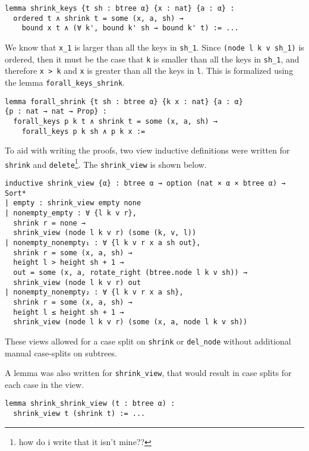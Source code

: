 \begin{lstlisting}
lemma shrink_keys {t sh : btree α} {x : nat} {a : α} :
  ordered t ∧ shrink t = some (x, a, sh) → 
    bound x t ∧ (∀ k', bound k' sh → bound k' t) := ...
\end{lstlisting}

We know that \lstinline{x_1} is larger than all the keys in \lstinline{sh_1}. Since \lstinline{(node l k v sh_1)} is ordered, then it must be the case that \lstinline{k} is smaller than all the keys in \lstinline{sh_1}, and therefore \lstinline{x > k} and \lstinline{x} is greater than all the keys in \lstinline{l}. This is formalized using the lemma \lstinline{forall_keys_shrink}.

\begin{lstlisting}
lemma forall_shrink {t sh : btree α} {k x : nat} {a : α} 
{p : nat → nat → Prop} :
  forall_keys p k t ∧ shrink t = some (x, a, sh) → 
    forall_keys p k sh ∧ p k x :=
\end{lstlisting}

To aid with writing the proofs, two view inductive definitions were written for \lstinline{shrink} and \lstinline{delete}\footnote{how do i write that it isn't mine??}. The \lstinline{shrink_view} is shown below.

\begin{lstlisting}
inductive shrink_view {α} : btree α → option (nat × α × btree α) → Sort*
| empty : shrink_view empty none
| nonempty_empty : ∀ {l k v r},
  shrink r = none →
  shrink_view (node l k v r) (some (k, v, l))
| nonempty_nonempty₁ : ∀ {l k v r x a sh out},
  shrink r = some (x, a, sh) →
  height l > height sh + 1 →
  out = some (x, a, rotate_right (btree.node l k v sh)) →
  shrink_view (node l k v r) out
| nonempty_nonempty₂ : ∀ {l k v r x a sh},
  shrink r = some (x, a, sh) →
  height l ≤ height sh + 1 →
  shrink_view (node l k v r) (some (x, a, node l k v sh))
\end{lstlisting}

These views allowed for a case split on \lstinline{shrink} or \lstinline{del_node} without additional manual case-splits on subtrees.

A lemma was also written for \lstinline{shrink_view}, that would result in case splits for each case in the view. 

\begin{lstlisting}
lemma shrink_shrink_view (t : btree α) : 
  shrink_view t (shrink t) := ...
\end{lstlisting}

